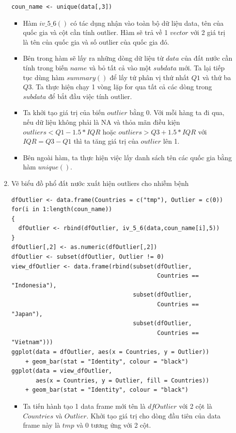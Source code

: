 \documentclass[a4paper]{article}
\theoremstyle{definition}
\begin{document}
\begin{enumerate}[i)]
\begin{enumerate}[1)]
\begin{lstlisting}[frame=single]
coun_name <- unique(data[,3])
\end{lstlisting}
\begin{itemize}
    \item Hàm $iv\_5\_6()$ có tác dụng nhận vào toàn bộ dữ liệu data, tên của quốc gia và cột cần tính outlier. Hàm sẽ trả về 1 $vector$ với 2 giá trị là tên của quốc gia và số outlier của quốc gia đó.
    \item Bên trong hàm sẽ lấy ra những dòng dữ liệu từ $data$ của đất nước cần tính trong biến $name$ và bỏ tất cả vào một $subdata$ mới. Ta lại tiếp tục dùng hàm $summary()$ để lấy tứ phân vị thứ nhất $Q1$ và thứ ba $Q3$. Ta thực hiện chạy 1 vòng lặp for qua tất cả các dòng trong $subdata$ để bắt đầu việc tính outlier.
    \item Ta khởi tạo giá trị của biến $outlier$ bằng 0. Với mỗi hàng ta đi qua, nếu dữ liệu không phải là NA và thỏa mãn điều kiện $outliers < Q1 - 1.5*IQR$ hoặc $outliers > Q3 + 1.5*IQR$ với $IQR = Q3 - Q1$ thì ta tăng giá trị của $outlier$ lên 1.
    \item Bên ngoài hàm, ta thực hiện việc lấy danh sách tên các quốc gia bằng hàm $unique()$.
\end{itemize}
    \item Vẽ biểu đồ phổ đất nước xuất hiện outliers cho nhiễm bệnh
    \lstset{
    title=Source code}
\begin{lstlisting}[frame=single]  
dfOutlier <- data.frame(Countries = c("tmp"), Outlier = c(0))
for(i in 1:length(coun_name))
{
  dfOutlier <- rbind(dfOutlier, iv_5_6(data,coun_name[i],5))
}
dfOutlier[,2] <- as.numeric(dfOutlier[,2])
dfOutlier <- subset(dfOutlier, Outlier != 0)
view_dfOutlier <- data.frame(rbind(subset(dfOutlier, 
                                          Countries == "Indonesia"),
                                   subset(dfOutlier, 
                                          Countries == "Japan"),
                                   subset(dfOutlier, 
                                          Countries == "Vietnam")))
ggplot(data = dfOutlier, aes(x = Countries, y = Outlier))
    + geom_bar(stat = "Identity", colour = "black")
ggplot(data = view_dfOutlier, 
       aes(x = Countries, y = Outlier, fill = Countries))
    + geom_bar(stat = "Identity", colour = "black")
\end{lstlisting}
\begin{itemize}
    \item Ta tiến hành tạo 1 data frame mới tên là $dfOutlier$ với 2 cột là $Countries$ và $Outlier$. Khởi tạo giá trị cho dòng đầu tiên của data frame này là $tmp$ và $0$ tương ứng với 2 cột.

\end{itemize}
\end{enumerate}
\end{enumerate}
\end{document}
